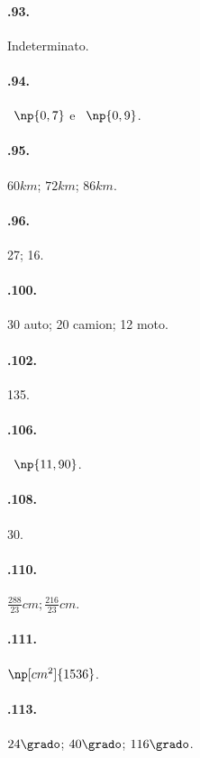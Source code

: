 \begin{multicols}{2}
\paragraph{\thechapter.93.} Indeterminato.

\paragraph{\thechapter.94.} \officialeuro~$\np{0,7}$ e \officialeuro~$\np{0,9}$.

\paragraph{\thechapter.95.} $60\unit{km}$; $72\unit{km}$; $86\unit{km}$.

\paragraph{\thechapter.96.} 27; 16.

\paragraph{\thechapter.100.} 30 auto; 20 camion; 12 moto.

\paragraph{\thechapter.102.} 135.

\paragraph{\thechapter.106.} \officialeuro~$\np{11,90}$.

\paragraph{\thechapter.108.} 30.

\paragraph{\thechapter.110.} $\frac{288}{23}\unit{cm};\frac{216}{23}\unit{cm}$.

\paragraph{\thechapter.111.} $\np[cm^2]{1536}$.

\paragraph{\thechapter.113.} $24\grado$; $40\grado$; $116\grado$.


\end{multicols}
